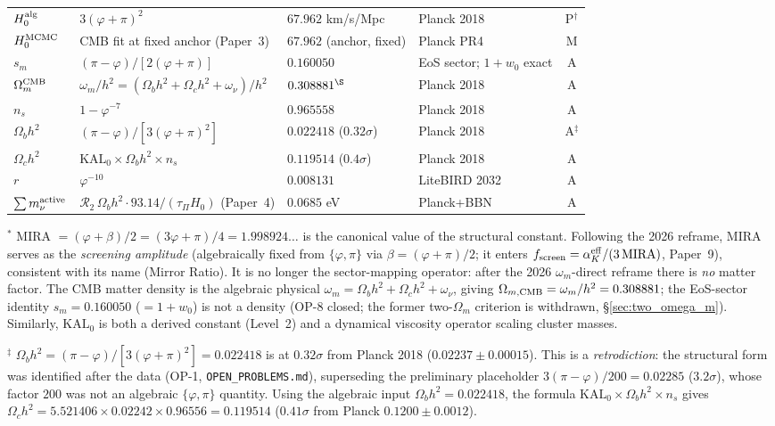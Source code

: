 \documentclass[12pt,a4paper]{article}
\begin{document}
\begin{table}[p]
\begin{tabularx}{\textwidth}{p{2.2cm}p{3.8cm}p{2.4cm}Xc}
$H_0^{\rm alg}$ & $3(\varphi+\pi)^2$ & $67.962$ km/s/Mpc & Planck 2018 & P$^\dagger$ \\
$H_0^{\rm MCMC}$ & CMB fit at fixed anchor (Paper~3) & $67.962$ (anchor, fixed) & Planck PR4 & M \\
$s_m$ & $(\pi-\varphi)/[2(\varphi+\pi)]$ & $0.160050$ & EoS sector; $1+w_0$ exact & A \\
$\Omega_m^{\rm CMB}$ & $\omega_m/h^2=(\Omega_b h^2{+}\Omega_c h^2{+}\omega_\nu)/h^2$ & $0.308881^\S$ & Planck 2018 & A \\
$n_s$     & $1-\varphi^{-7}$ & $0.965558$ & Planck 2018 & A \\
$\Omega_b h^2$ & $(\pi-\varphi)/[3(\varphi+\pi)^2]$ & $0.022418$ ($0.32\sigma$) & Planck 2018 & A$^\ddagger$ \\
$\Omega_c h^2$ & $\mathrm{KAL}_0\times\Omega_b h^2\times n_s$ & $0.119514$ ($0.4\sigma$) & Planck 2018 & A \\
$r$       & $\varphi^{-10}$ & $0.008131$ & LiteBIRD 2032 & A \\
$\sum m_\nu^{\rm active}$ & $\mathcal{R}_2\,\Omega_b h^2\cdot93.14/(\tau_\Pi H_0)$ (Paper~4) & $0.0685$ eV & Planck+BBN & A \\
\bottomrule
\end{tabularx}
\end{table}

\noindent\footnotesize $^*$ MIRA $= (\varphi+\beta)/2 = (3\varphi+\pi)/4 = 1.998924\ldots$
is the canonical value of the structural constant.
Following the 2026 reframe, MIRA serves as the \textit{screening amplitude}
(algebraically fixed from $\{\varphi,\pi\}$ via $\beta=(\varphi+\pi)/2$; it
enters $f_{\rm screen}=\alpha_K^{\rm eff}/(3\,\mathrm{MIRA})$, Paper~9), consistent with
its name (Mirror Ratio). It is no longer the sector-mapping operator: after the
2026 $\omega_m$-direct reframe there is \emph{no} matter factor. The CMB matter
density is the algebraic physical $\omega_m=\Omega_b h^2+\Omega_c h^2+\omega_\nu$,
giving $\Omega_{m,\rm CMB}=\omega_m/h^2=0.308881$; the EoS-sector identity
$s_m=0.160050$ ($=1+w_0$) is not a density (OP-8 closed; the former
two-$\Omega_m$ criterion is withdrawn, \S\ref{sec:two_omega_m}).
Similarly, $\mathrm{KAL}_0$ is both a derived constant (Level~2) and
a dynamical viscosity operator scaling cluster masses.

\footnotesize $^\ddagger$ $\Omega_b h^2=(\pi-\varphi)/[3(\varphi+\pi)^2]=0.022418$ is at $0.32\sigma$ from Planck 2018 ($0.02237\pm0.00015$).
This is a \emph{retrodiction}: the structural form was identified after the data (OP-1, \texttt{OPEN\_PROBLEMS.md}),
superseding the preliminary placeholder $3(\pi-\varphi)/200=0.02285$ ($3.2\sigma$), whose factor $200$ was not an
algebraic $\{\varphi,\pi\}$ quantity.
Using the algebraic input $\Omega_b h^2=0.022418$, the formula
$\mathrm{KAL}_0\times\Omega_b h^2\times n_s$ gives
$\Omega_c h^2 = 5.521406\times0.02242\times0.96556 = 0.119514$ ($0.41\sigma$ from Planck $0.1200\pm0.0012$).
\end{document}
